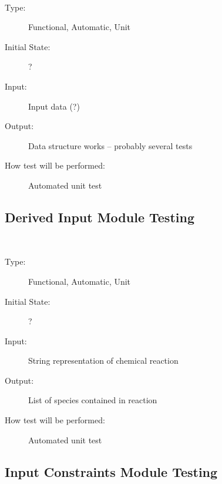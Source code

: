 \documentclass[12pt, titlepage]{article}
\newcounter{testnum} %
\begin{document}
\begin{addmargin}[2em]{0em}
\\
\begin{addmargin}[2em]{0em}
\begin{description}
\item[Type:] Functional, Automatic, Unit
					
\item[Initial State:] ?
					
\item[Input:] Input data (?)
					
\item[Output:] Data structure works -- probably several tests
					
\item[How test will be performed:] Automated unit test\\
\end{description}
\end{addmargin}
\end{addmargin}


\subsection{Derived Input Module Testing}

\begin{addmargin}[2em]{0em}
\\
\begin{addmargin}[2em]{0em}
\begin{description}
\item[Type:] Functional, Automatic, Unit
					
\item[Initial State:] ?
					
\item[Input:] String representation of chemical reaction
					
\item[Output:] List of species contained in reaction
					
\item[How test will be performed:] Automated unit test\\
\end{description}
\end{addmargin}
\end{addmargin}

\subsection{Input Constraints Module Testing}
\end{document}
